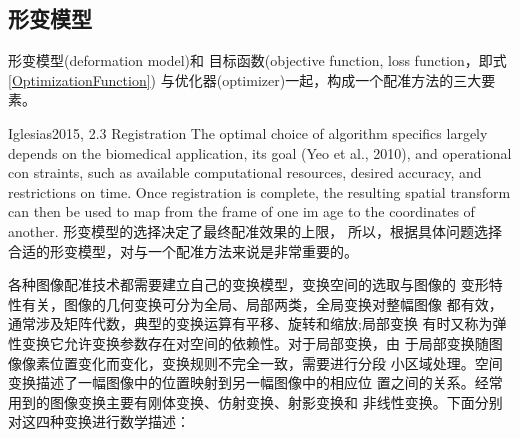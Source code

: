 \subsection{形变模型}\label{SectionTransformation}
形变模型(deformation model)和
目标函数(objective function, loss function，即式\ref{OptimizationFunction})
与优化器(optimizer)一起，构成一个配准方法的三大要素。

Iglesias2015, 2.3 Registration
The optimal choice of algorithm specifics largely depends on the
biomedical application, its goal (Yeo et al., 2010), and operational con
straints, such as available computational resources, desired accuracy,
and restrictions on time. Once registration is complete, the resulting
spatial transform can then be used to map from the frame of one im
age to the coordinates of another.
形变模型的选择决定了最终配准效果的上限，
所以，根据具体问题选择合适的形变模型，对与一个配准方法来说是非常重要的。

各种图像配准技术都需要建立自己的变换模型，变换空间的选取与图像的
变形特性有关，图像的几何变换可分为全局、局部两类，全局变换对整幅图像
都有效，通常涉及矩阵代数，典型的变换运算有平移、旋转和缩放;局部变换
有时又称为弹性变换它允许变换参数存在对空间的依赖性。对于局部变换，由
于局部变换随图像像素位置变化而变化，变换规则不完全一致，需要进行分段
小区域处理。空间变换描述了一幅图像中的位置映射到另一幅图像中的相应位
置之间的关系。经常用到的图像变换主要有刚体变换、仿射变换、射影变换和
非线性变换。下面分别对这四种变换进行数学描述：

